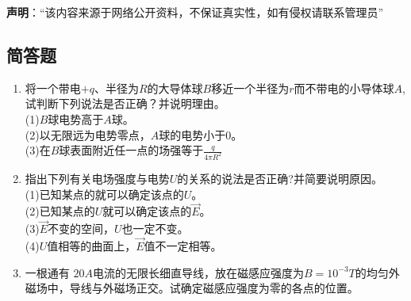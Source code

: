 

\textbf{声明}：“该内容来源于网络公开资料，不保证真实性，如有侵权请联系管理员”

\subsection{简答题}
\begin{enumerate}
\item 将一个带电$+q$、半径为$R$的大导体球$B$移近一个半径为$r$而不带电的小导体球$A$,试判断下列说法是否正确？并说明理由。\\
(1)$B$球电势高于$A$球。\\
(2)以无限远为电势零点，$A$球的电势小于0。\\
(3)在$B$球表面附近任一点的场强等于$\displaystyle \frac{q}{4\pi R^2}$
\item 指出下列有关电场强度与电势$U$的关系的说法是否正确?并简要说明原因。\\
(1)已知某点的就可以确定该点的$U$。\\
(2)已知某点的$U$就可以确定该点的$\vec E$。\\
(3)$\vec E$不变的空间，$U$也一定不变。\\
(4)$U$值相等的曲面上，$\vec E$值不一定相等。
\item 一根通有 $20A $电流的无限长细直导线，放在磁感应强度为$B=10^{-3}T$的均匀外磁场中，导线与外磁场正交。试确定磁感应强度为零的各点的位置。
\end{enumerate}

